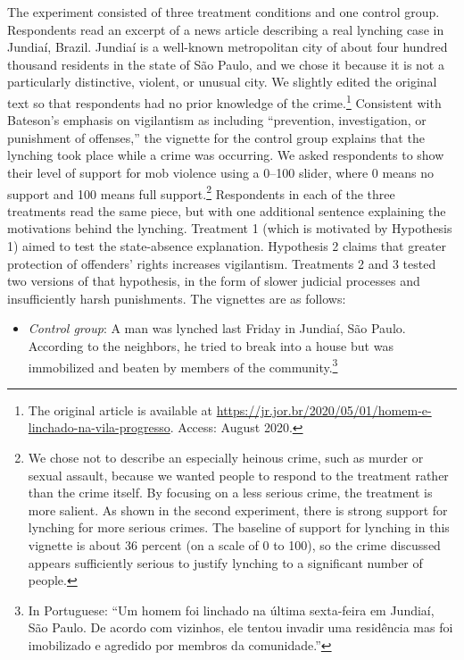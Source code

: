\documentclass[12pt,ansiapaper]{article}
\providecommand{\tightlist}{%
   \setlength{\itemsep}{0pt}\setlength{\parskip}{0pt}}
\begin{document}
The experiment consisted of three treatment conditions and one control group. Respondents read an excerpt of a news article describing a real lynching case in Jundia\'{i}, Brazil. Jundia\'{i} is a well-known metropolitan city of about four hundred thousand residents in the state of S\~{a}o Paulo, and we chose it because it is not a particularly distinctive, violent, or unusual city. We slightly edited the original text so that respondents had no prior knowledge of the crime.\footnote{The original article is available at \url{https://jr.jor.br/2020/05/01/homem-e-linchado-na-vila-progresso}. Access: August 2020.} Consistent with Bateson's \citeyearpar[3]{bateson2020politics} emphasis on vigilantism as including ``prevention, investigation, or punishment of offenses,'' the vignette for the control group explains that the lynching took place while a crime was occurring. We asked respondents to show their level of support for mob violence using a 0--100 slider, where 0 means no support and 100 means full support.\footnote{We chose not to describe an especially heinous crime, such as murder or sexual assault, because we wanted people to respond to the treatment rather than the crime itself. By focusing on a less serious crime, the treatment is more salient. As shown in the second experiment, there is strong support for lynching for more serious crimes. The baseline of support for lynching in this vignette is about 36 percent (on a scale of 0 to 100), so the crime discussed appears sufficiently serious to justify lynching to a significant number of people.} Respondents in each of the three treatments read the same piece, but with one additional sentence explaining the motivations behind the lynching. Treatment 1 (which is motivated by Hypothesis 1) aimed to test the state-absence explanation. Hypothesis 2 claims that greater protection of offenders' rights increases vigilantism. Treatments 2 and 3 tested two versions of that hypothesis, in the form of slower judicial processes and insufficiently harsh punishments. The vignettes are as follows:

\begin{itemize}
\tightlist
\item
  \emph{Control group}: A man was lynched last Friday in Jundiaí, São Paulo. According to the neighbors, he tried to break into a house but was immobilized and beaten by members of the community.\footnote{In Portuguese: ``Um homem foi linchado na última sexta-feira em Jundiaí, São Paulo. De acordo com vizinhos, ele tentou invadir uma residência mas foi imobilizado e agredido por membros da comunidade.''}
\end{itemize}
\end{document}

